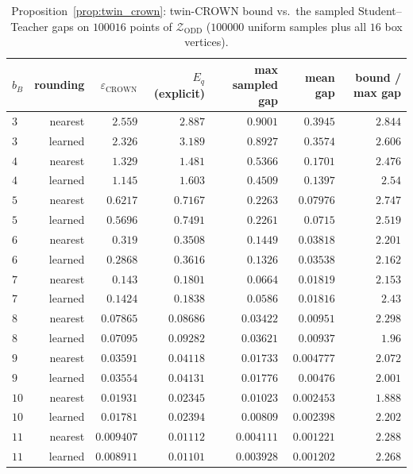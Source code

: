 \begin{table}[t]
\centering
\caption{Proposition~\ref{prop:twin_crown}: twin-CROWN bound vs.\ the sampled Student--Teacher gaps on $100016$ points of $\mathcal{Z}_{\mathrm{ODD}}$ ($100000$ uniform samples plus all $16$ box vertices).}
\label{tab:exp2_crown}
\footnotesize
\setlength{\tabcolsep}{4pt}
\begin{tabular}{lrrrrrr}
\toprule
$b_B$ & rounding & $\varepsilon_{\mathrm{CROWN}}$ & $E_q$ (explicit) & max sampled gap & mean gap & bound / max gap \\
\midrule
$3$ & nearest & $2.559$ & $2.887$ & $0.9001$ & $0.3945$ & $2.844$ \\
$3$ & learned & $2.326$ & $3.189$ & $0.8927$ & $0.3574$ & $2.606$ \\
$4$ & nearest & $1.329$ & $1.481$ & $0.5366$ & $0.1701$ & $2.476$ \\
$4$ & learned & $1.145$ & $1.603$ & $0.4509$ & $0.1397$ & $2.54$ \\
$5$ & nearest & $0.6217$ & $0.7167$ & $0.2263$ & $0.07976$ & $2.747$ \\
$5$ & learned & $0.5696$ & $0.7491$ & $0.2261$ & $0.0715$ & $2.519$ \\
$6$ & nearest & $0.319$ & $0.3508$ & $0.1449$ & $0.03818$ & $2.201$ \\
$6$ & learned & $0.2868$ & $0.3616$ & $0.1326$ & $0.03538$ & $2.162$ \\
$7$ & nearest & $0.143$ & $0.1801$ & $0.0664$ & $0.01819$ & $2.153$ \\
$7$ & learned & $0.1424$ & $0.1838$ & $0.0586$ & $0.01816$ & $2.43$ \\
$8$ & nearest & $0.07865$ & $0.08686$ & $0.03422$ & $0.00951$ & $2.298$ \\
$8$ & learned & $0.07095$ & $0.09282$ & $0.03621$ & $0.00937$ & $1.96$ \\
$9$ & nearest & $0.03591$ & $0.04118$ & $0.01733$ & $0.004777$ & $2.072$ \\
$9$ & learned & $0.03554$ & $0.04131$ & $0.01776$ & $0.00476$ & $2.001$ \\
$10$ & nearest & $0.01931$ & $0.02345$ & $0.01023$ & $0.002453$ & $1.888$ \\
$10$ & learned & $0.01781$ & $0.02394$ & $0.00809$ & $0.002398$ & $2.202$ \\
$11$ & nearest & $0.009407$ & $0.01112$ & $0.004111$ & $0.001221$ & $2.288$ \\
$11$ & learned & $0.008911$ & $0.01101$ & $0.003928$ & $0.001202$ & $2.268$ \\

\end{tabular}
\end{table}
